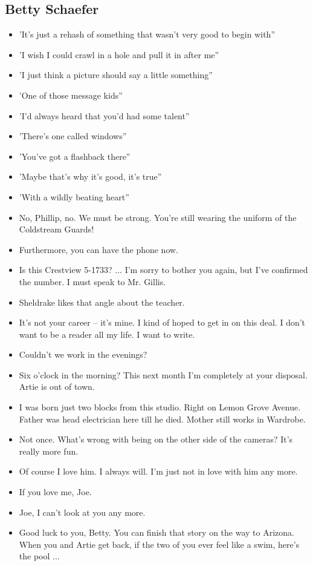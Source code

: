 \documentclass[a4paper]{article}
\begin{document}
\subsection{Betty Schaefer}
\begin{itemize}
\item 'It’s just a rehash of something that wasn’t very good to begin with”
\item 'I wish I could crawl in a hole and pull it in after me”
\item 'I just think a picture should say a little something”
\item 'One of those message kids”
\item 'I’d always heard that you'd had some talent”
\item 'There's one called windows”
\item 'You’ve got a flashback there”
\item 'Maybe that's why it's good, it's true”
\item 'With a wildly beating heart”
\item No, Phillip, no. We must be strong. You're still wearing the uniform of the Coldstream Guards!
\item Furthermore, you can have the phone now.
\item Is this Crestview 5-1733? ... I'm sorry to bother you again, but I've confirmed the number. I must speak to Mr. Gillis.
\item Sheldrake likes that angle about the teacher.
\item It's not your career -- it's mine. I kind of hoped to get in on this deal. I don't want to be a reader all my life. I want to write.
\item Couldn't we work in the evenings?
\item Six o'clock in the morning? This next month I'm completely at your disposal. Artie is out of town.
\item I was born just two blocks from this studio. Right on Lemon Grove Avenue. Father was head electrician here till he died. Mother still works in Wardrobe.
\item Not once. What's wrong with being on the other side of the cameras? It's really more fun.
\item Of course I love him. I always will. I'm just not in love with him any more.
\item If you love me, Joe.
\item Joe, I can't look at you any more.
\item Good luck to you, Betty. You can finish that story on the way to Arizona. When you and Artie get back, if the two of you ever feel like a swim, here's the pool ...
\end{itemize}
\end{document}
